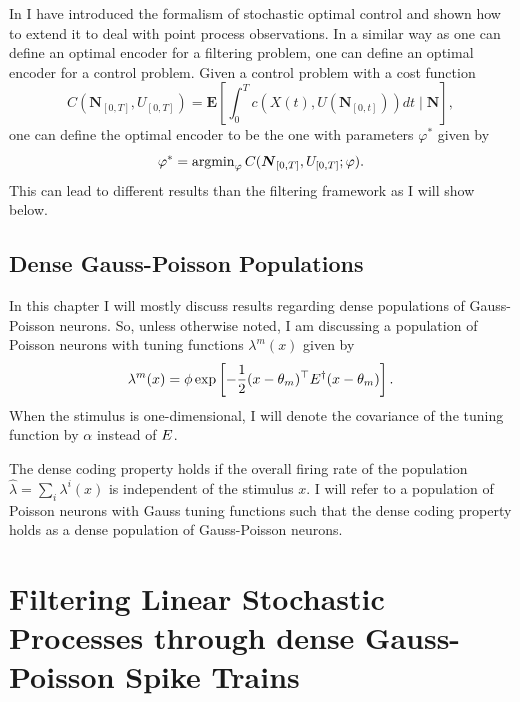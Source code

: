 In  I have introduced the formalism of stochastic optimal control and shown how to extend it to deal with point process observations. In a similar way
as one can define an optimal encoder for a filtering problem, one can define an optimal encoder for a control problem. Given a control problem with a cost function
\[
C(\boldsymbol{N}_{[0,T]},U_{[0,T]}) =\boldsymbol{E}\left[ \int_0^T c(X(t),U(\boldsymbol{N}_{[0,t]})) dt\mid \boldsymbol{N}\right],
\]
one can define the optimal encoder to be the one with parameters $\varphi^*$ given by
\[
\varphi^* = \operatorname{argmin}_\varphi C(\boldsymbol{N}_{[0,T]},U_{[0,T]};\varphi).
\]
This can lead to different results than the filtering framework as  I will show below.\par

\subsection{Dense Gauss-Poisson Populations}

In this chapter I will mostly discuss results regarding dense populations of Gauss-Poisson neurons. So, unless otherwise noted, I am discussing a population of Poisson neurons
with tuning functions $\lambda^m(x)$ given by
\begin{equation}
\label{eq:tuning_function}
\lambda^m(x) = \phi \exp\left[-\frac{1}{2} (x-\theta_m)^\top \covar^\dagger (x-\theta_m)\right].
\end{equation}
When the stimulus is one-dimensional, I will denote the covariance of the tuning function by $\alpha$ instead of $E$.\par
The dense coding property holds if the overall firing rate of the population $\hat{\lambda} = \sum_i \lambda^i(x)$ is independent of the stimulus $x$. I will refer to a population
of Poisson neurons with Gauss tuning functions such that the dense coding property holds as a dense population of Gauss-Poisson neurons.


\section{Filtering Linear Stochastic Processes through dense Gauss-Poisson Spike Trains}


